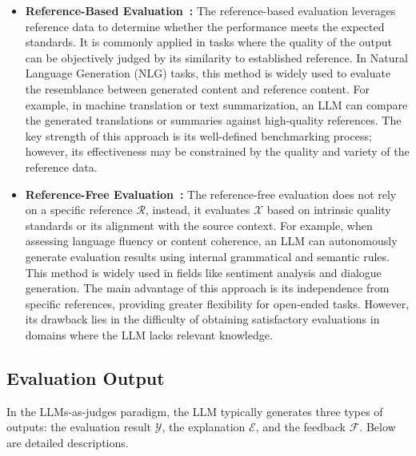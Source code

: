 \begin{itemize}[leftmargin=*]
\item \textbf{Reference-Based Evaluation~\cite{freitag2021results,karpinska2023large}: }
The reference-based evaluation leverages reference data to determine whether the performance meets the expected standards. It is commonly applied in tasks where the quality of the output can be objectively judged by its similarity to established reference. In Natural Language Generation (NLG) tasks, this method is widely used to evaluate the resemblance between generated content and reference content. For example, in machine translation or text summarization, an LLM can compare the generated translations or summaries against high-quality references. The key strength of this approach is its well-defined benchmarking process; however, its effectiveness may be constrained by the quality and variety of the reference data.

\item \textbf{Reference-Free Evaluation~\cite{shen2023opinsummeval,zheng2023judging,he2023socreval}: }
The reference-free evaluation does not rely on a specific reference $\mathcal{R}$, instead, it evaluates $\mathcal{X}$ based on intrinsic quality standards or its alignment with the source context. For example, when assessing language fluency or content coherence, an LLM can autonomously generate evaluation results using internal grammatical and semantic rules. This method is widely used in fields like sentiment analysis and dialogue generation. The main advantage of this approach is its independence from specific references, providing greater flexibility for open-ended tasks. However, its drawback lies in the difficulty of obtaining satisfactory evaluations in domains where the LLM lacks relevant knowledge.
\end{itemize}

\subsection{Evaluation Output}

In the LLMs-as-judges paradigm, the LLM typically generates three types of outputs: the evaluation result $\mathcal{Y}$, the explanation $\mathcal{E}$, and the feedback $\mathcal{F}$. Below are detailed descriptions.


